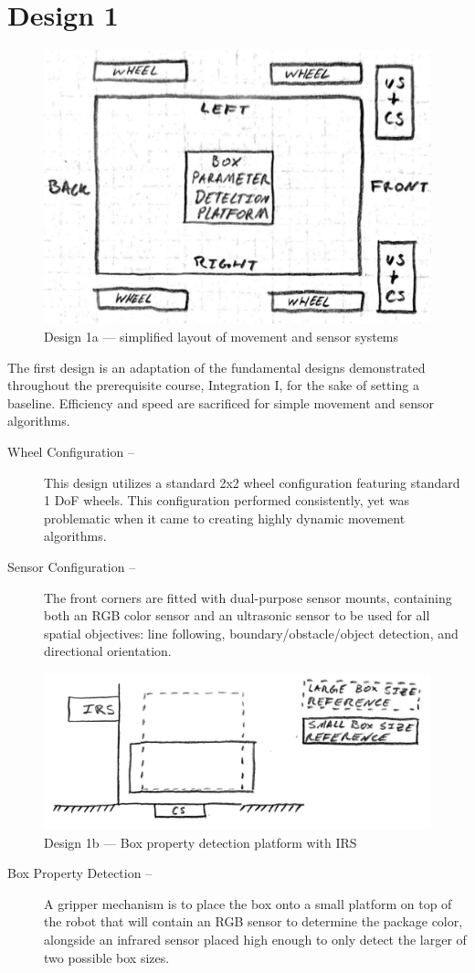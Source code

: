 \documentclass[11pt]{report}
\begin{document}
\section{Design 1}\label{sec:design1}
\begin{figure}[H]
    \centering
    \includegraphics[width=0.5\linewidth]{Images//Designs/Design1a.pdf}
    \caption{Design 1a --- simplified layout of movement and sensor systems}
    \label{fig:design1a}
\end{figure}
The first design is an adaptation of the fundamental designs demonstrated throughout the prerequisite course, Integration I, for the sake of setting a baseline. Efficiency and speed are sacrificed for simple movement and sensor algorithms.

\begin{description}
    \item[Wheel Configuration --] This design utilizes a standard 2x2 wheel configuration featuring standard 1 \gls{DoF} wheels. This configuration performed consistently, yet was problematic when it came to creating highly dynamic movement algorithms.
    \item[Sensor Configuration --] The front corners are fitted with dual-purpose sensor mounts, containing both an \gls{RGB} color sensor and an ultrasonic sensor to be used for all spatial objectives: line following, boundary/obstacle/object detection, and directional orientation.
\end{description}

\begin{figure}[H]
    \centering
    \hspace*{6em}
    \includegraphics[width=0.6\linewidth]{Images//Designs/Design1b.pdf}
    \caption{Design 1b --- Box property detection platform with IRS}
    \label{fig:design1b}
\end{figure}
\begin{description}
    \item[Box Property Detection --]A gripper mechanism is to place the box onto a small platform on top of the robot that will contain an \gls{RGB} sensor to determine the package color, alongside an infrared sensor placed high enough to only detect the larger of two possible box sizes.
\end{description}
\end{document}
